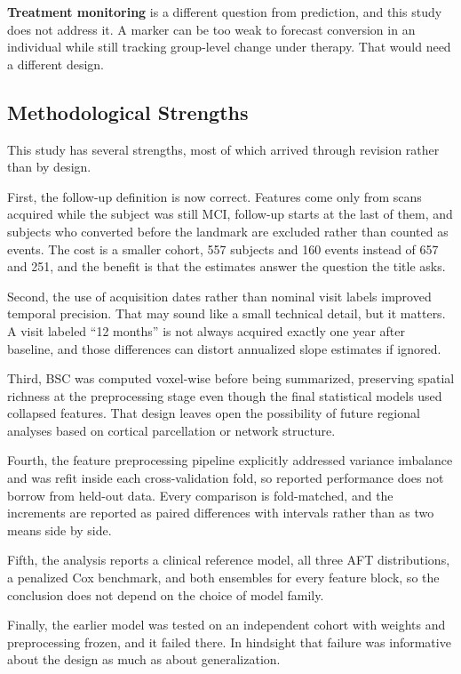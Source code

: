 \documentclass[blue]{ludusofficial}  %
\begin{document}
\textbf{Treatment monitoring} is a different question from prediction, and this study does not address it. A marker can be too weak to forecast conversion in an individual while still tracking group-level change under therapy. That would need a different design.

\subsection{Methodological Strengths}

This study has several strengths, most of which arrived through revision rather than by design.

First, the follow-up definition is now correct. Features come only from scans acquired while the subject was still MCI, follow-up starts at the last of them, and subjects who converted before the landmark are excluded rather than counted as events. The cost is a smaller cohort, 557 subjects and 160 events instead of 657 and 251, and the benefit is that the estimates answer the question the title asks.

Second, the use of acquisition dates rather than nominal visit labels improved temporal precision. That may sound like a small technical detail, but it matters. A visit labeled ``12 months'' is not always acquired exactly one year after baseline, and those differences can distort annualized slope estimates if ignored.

Third, BSC was computed voxel-wise before being summarized, preserving spatial richness at the preprocessing stage even though the final statistical models used collapsed features. That design leaves open the possibility of future regional analyses based on cortical parcellation or network structure.

Fourth, the feature preprocessing pipeline explicitly addressed variance imbalance and was refit inside each cross-validation fold, so reported performance does not borrow from held-out data. Every comparison is fold-matched, and the increments are reported as paired differences with intervals rather than as two means side by side.

Fifth, the analysis reports a clinical reference model, all three AFT distributions, a penalized Cox benchmark, and both ensembles for every feature block, so the conclusion does not depend on the choice of model family.

Finally, the earlier model was tested on an independent cohort with weights and preprocessing frozen, and it failed there. In hindsight that failure was informative about the design as much as about generalization.
\end{document}
